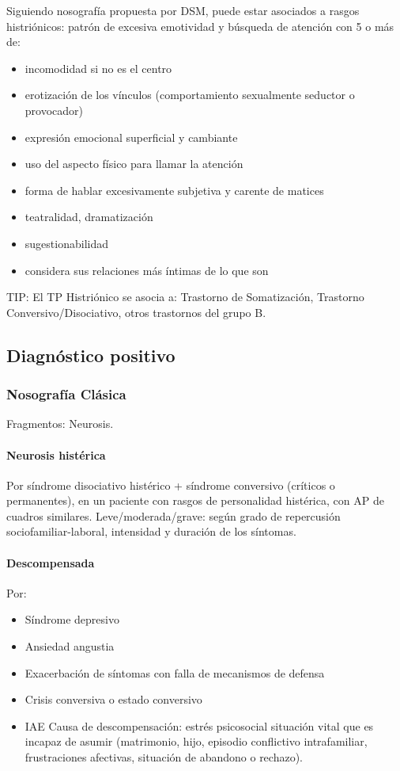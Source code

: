 Siguiendo nosografía propuesta por DSM, puede estar asociados a rasgos histriónicos: patrón de excesiva emotividad y búsqueda de atención con 5 o más de:
\begin{itemize}
	\item incomodidad si no es el centro
	\item erotización de los vínculos (comportamiento sexualmente seductor o provocador)
	\item expresión emocional superficial y cambiante
	\item uso del aspecto físico para llamar la atención
	\item forma de hablar excesivamente subjetiva y carente de matices
	\item teatralidad, dramatización
	\item sugestionabilidad
	\item considera sus relaciones más íntimas de lo que son
\end{itemize}

TIP: El TP Histriónico se asocia a: Trastorno de Somatización, Trastorno Conversivo/Disociativo, otros trastornos del grupo B.

\subsection*{Diagnóstico positivo}
\subsubsection*{Nosografía Clásica}
\faPaste Fragmentos: Neurosis.
\paragraph{Neurosis histérica}
Por síndrome disociativo histérico + síndrome conversivo (críticos o permanentes), en un paciente con rasgos de personalidad histérica, con AP de cuadros similares. Leve/moderada/grave: según grado de repercusión sociofamiliar-laboral, intensidad y duración de los síntomas.

\paragraph{Descompensada}
Por:
\begin{itemize}
	\item Síndrome depresivo
	\item Ansiedad angustia
	\item Exacerbación de síntomas con falla de mecanismos de defensa
	\item Crisis conversiva o estado conversivo
	\item IAE Causa de descompensación: estrés psicosocial situación vital que es incapaz de asumir (matrimonio, hijo, episodio conflictivo intrafamiliar, frustraciones afectivas, situación de abandono o rechazo).
\end{itemize}
